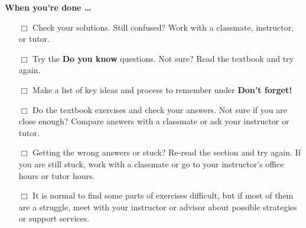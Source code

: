 
\noindent \textbf{When you're done \ldots}

\begin{itemize}
\item [$\Box$] Check your solutions.  Still confused?  Work with a classmate, instructor, or tutor.
\item [$\Box$] Try the \textbf{Do you know} questions.  Not sure?  Read the textbook and try again.
\item [$\Box$] Make a list of key ideas and process to remember under \textbf{Don't forget!}
\item [$\Box$] Do the textbook exercises and check your answers. Not sure if you are close enough? Compare answers with a classmate or ask your instructor or tutor.  
\item [$\Box$] Getting the wrong answers or stuck?  Re-read the section and try again.   If you are still stuck, work with a classmate or go to your instructor's office hours or tutor hours.
\item [$\Box$] It is normal to find some parts of exercises difficult, but if most of them are a struggle, meet with your instructor or advisor about possible strategies or support services.
\end{itemize}



